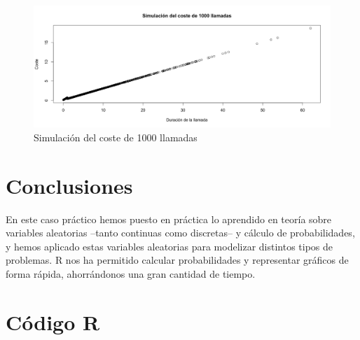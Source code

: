 \documentclass[12pt,a4paper,twoside,openright,titlepage,final]{article}
\begin{document}
\begin{figure}[tbph!]
\centering
\includegraphics[width=0.9\linewidth]{imagenes/simulacion}
\caption{Simulación del coste de 1000 llamadas}
\label{fig:simulacion}
\end{figure}

\section{Conclusiones}

En este caso práctico hemos puesto en práctica lo aprendido en teoría sobre variables aleatorias --tanto continuas como discretas-- y cálculo de probabilidades, y hemos aplicado estas variables aleatorias para modelizar distintos tipos de problemas. R nos ha permitido calcular probabilidades y representar gráficos de forma rápida, ahorrándonos una gran cantidad de tiempo. 

\newpage

\section{Código R}


\end{document}
